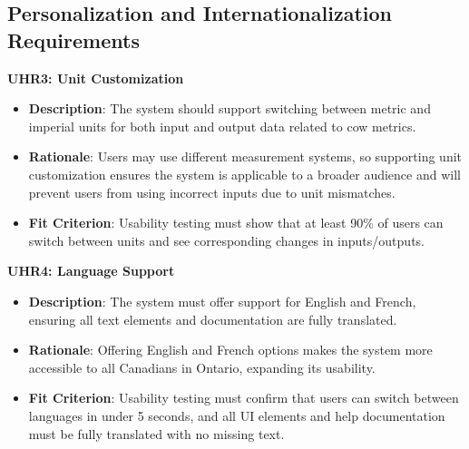 \documentclass[12pt]{article}
\begin{document}
\subsection{Personalization and Internationalization Requirements}
\textbf{UHR3: Unit Customization}
\begin{itemize}
    \item \textbf{Description}: The system should support switching between
    metric and imperial units for both input and output data related to cow
    metrics.
    \item \textbf{Rationale}: Users may use different measurement systems, so
    supporting unit customization ensures the system is applicable to a broader
    audience and will prevent users from using incorrect inputs due to unit
    mismatches.
    \item \textbf{Fit Criterion}: Usability testing must show that at least
    90\% of users can switch between units and see corresponding changes in
    inputs/outputs.
\end{itemize}
\textbf{UHR4: Language Support}
\begin{itemize}
    \item \textbf{Description}: The system must offer support for English and
    French, ensuring all text elements and documentation are fully translated.
    \item \textbf{Rationale}: Offering English and French options makes the
    system more accessible to all Canadians in Ontario, expanding its usability.
    \item \textbf{Fit Criterion}: Usability testing must confirm that users can
    switch between languages in under 5 seconds, and all UI elements and help
    documentation must be fully translated with no missing text.
\end{itemize}
\end{document}
